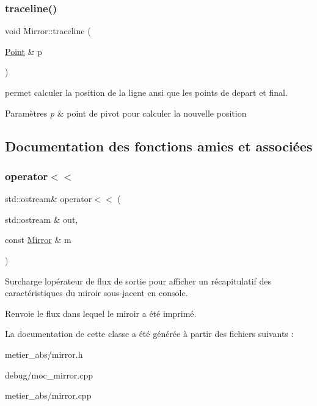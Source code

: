 \subsubsection{\texorpdfstring{traceline()}{traceline()}}
{\footnotesize\ttfamily void Mirror\+::traceline (\begin{DoxyParamCaption}\item[{\mbox{\hyperlink{class_point}{Point}} \&}]{p }\end{DoxyParamCaption})}

permet calculer la position de la ligne ansi que les points de depart et final. 
\begin{DoxyParams}{Paramètres}
{\em p} & point de pivot pour calculer la nouvelle position \\
\hline
\end{DoxyParams}


\subsection{Documentation des fonctions amies et associées}
\mbox{\label{class_mirror_a18a9b61e5b925d085bd1560fcf289b0c}} 
\subsubsection{\texorpdfstring{operator$<$$<$}{operator<<}}
{\footnotesize\ttfamily std\+::ostream\& operator$<$$<$ (\begin{DoxyParamCaption}\item[{std\+::ostream \&}]{out,  }\item[{const \mbox{\hyperlink{class_mirror}{Mirror}} \&}]{m }\end{DoxyParamCaption})\hspace{0.3cm}{\ttfamily [friend]}}

Surcharge l\textquotesingle{}opérateur de flux de sortie pour afficher un récapitulatif des caractéristiques du miroir sous-\/jacent en console. \begin{DoxyReturn}{Renvoie}
le flux dans lequel le miroir a été imprimé. 
\end{DoxyReturn}


La documentation de cette classe a été générée à partir des fichiers suivants \+:\begin{DoxyCompactItemize}
\item 
metier\+\_\+abs/mirror.\+h\item 
debug/moc\+\_\+mirror.\+cpp\item 
metier\+\_\+abs/mirror.\+cpp\end{DoxyCompactItemize}
